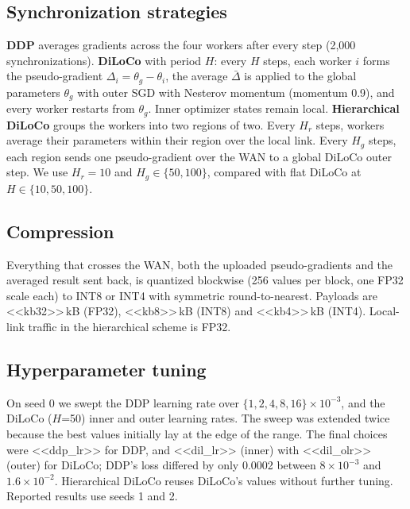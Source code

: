 \documentclass[conference]{IEEEtran}
\begin{document}
\subsection{Synchronization strategies}
\textbf{DDP} averages gradients across the four workers after every step (2,000 synchronizations). \textbf{DiLoCo} with period $H$: every $H$ steps, each worker $i$ forms the pseudo-gradient $\Delta_i=\theta_g-\theta_i$, the average $\bar\Delta$ is applied to the global parameters $\theta_g$ with outer SGD with Nesterov momentum (momentum 0.9), and every worker restarts from $\theta_g$. Inner optimizer states remain local. \textbf{Hierarchical DiLoCo} groups the workers into two regions of two. Every $H_r$ steps, workers average their parameters within their region over the local link. Every $H_g$ steps, each region sends one pseudo-gradient over the WAN to a global DiLoCo outer step. We use $H_r=10$ and $H_g\in\{50,100\}$, compared with flat DiLoCo at $H\in\{10,50,100\}$.

\subsection{Compression}
Everything that crosses the WAN, both the uploaded pseudo-gradients and the averaged result sent back, is quantized blockwise (256 values per block, one FP32 scale each) to INT8 or INT4 with symmetric round-to-nearest. Payloads are <<kb32>>\,kB (FP32), <<kb8>>\,kB (INT8) and <<kb4>>\,kB (INT4). Local-link traffic in the hierarchical scheme is FP32.

\subsection{Hyperparameter tuning}
On seed 0 we swept the DDP learning rate over $\{1,2,4,8,16\}\times10^{-3}$, and the DiLoCo ($H$=50) inner and outer learning rates. The sweep was extended twice because the best values initially lay at the edge of the range. The final choices were <<ddp_lr>> for DDP, and <<dil_lr>> (inner) with <<dil_olr>> (outer) for DiLoCo; DDP's loss differed by only 0.0002 between $8\times10^{-3}$ and $1.6\times10^{-2}$. Hierarchical DiLoCo reuses DiLoCo's values without further tuning. Reported results use seeds 1 and 2.
\end{document}
